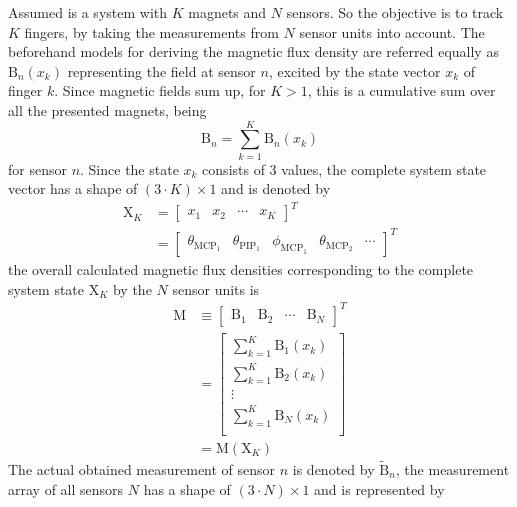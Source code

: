 Assumed is a system with $ K $ magnets and $ N $ sensors. So the objective is to track $ K $ fingers, by taking the measurements from $ N $ sensor units into account. The beforehand models for deriving the magnetic flux density are referred equally as $ \mathrm{B}_{n}(x_{k}) $ representing the field at sensor $ n $, excited by the state vector $ x_{k} $ of finger $ k $. Since magnetic fields sum up, for $ K > 1 $, this is a cumulative sum over all the presented magnets, being
\begin{equation}
\mathrm{B}_{n} = \sum_{k=1}^{K} \mathrm{B}_n(x_{k})
\end{equation}
for sensor $ n $. Since the state $ x_{k} $ consists of 3 values, the complete system state vector has a shape of $ (3 \cdot K) \times 1 $ and is denoted by
\begin{equation}
\begin{aligned}
\mathrm{X}_K &= \begin{bmatrix} x_{1} & x_{2} & \cdots & x_{K}  \end{bmatrix}^{T}\\
 &= \begin{bmatrix} \theta_{\mathrm{MCP}_{1}} & \theta_{\mathrm{PIP}_{1}} & \phi_{\mathrm{MCP}_{1}} & \theta_{\mathrm{MCP}_{2}} & \cdots \end{bmatrix}^{T}
\end{aligned}
\end{equation}
the overall calculated magnetic flux densities corresponding to the complete system state $ \mathrm{X}_{K} $ by the $ N $ sensor units is 
\begin{equation}
\begin{aligned}
\mathrm{M} &\equiv \begin{bmatrix} {\mathrm{B}}_{1} & {\mathrm{B}}_{2} & \cdots & {\mathrm{B}}_{N} \end{bmatrix}^{T}\\
		&= \begin{bmatrix}
			\sum_{k=1}^{K} \mathrm{B}_1(x_{k})\\
			\sum_{k=1}^{K} \mathrm{B}_2(x_{k})\\
			\vdots \\
		    \sum_{k=1}^{K} \mathrm{B}_N(x_{k})\\
		\end{bmatrix} \\
	    &= \mathrm{M}(\mathrm{X}_K)
\end{aligned}
\end{equation}
The actual obtained measurement of sensor $ n $ is denoted by $ \tilde{\mathrm{B}}_{n} $, the measurement array of all sensors $ N $ has a shape of $ (3 \cdot N) \times 1 $ and is represented by
